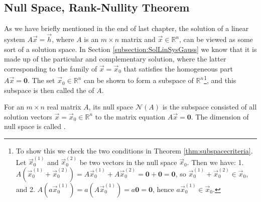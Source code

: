 \subsection{Null Space, Rank-Nullity Theorem}
\label{section:null}

As we have briefly mentioned in the end of last chapter, the solution of a linear system $A\vec{x} = \vec{h}$, where $A$ is an $m \times n$ matrix and $\vec{x} \in \mathbb{R}^n$, can be viewed as some sort of a solution space. In Section \ref{subsection:SolLinSysGauss} we know that it is made up of the particular and complementary solution, where the latter corresponding to the family of $\vec{x} = \vec{x}_0$ that satisfies the homogeneous part $A\vec{x} = \textbf{0}$. The set $\vec{x}_0 \in \mathbb{R}^n$ can be shown to form a subspace of $\mathbb{R}^n$\footnote{To show this we check the two conditions in Theorem \ref{thm:subspacecriteria}. Let $\vec{x}_0^{(1)}$ and $\vec{x}_0^{(2)}$ be two vectors in the null space $\vec{x}_0$. Then we have: 1. $A(\vec{x}_0^{(1)} + \vec{x}_0^{(2)}) = A\vec{x}_0^{(1)} + A\vec{x}_0^{(2)} = \textbf{0} + \textbf{0} = \textbf{0}$, so $\vec{x}_0^{(1)} + \vec{x}_0^{(2)} \in \vec{x}_0$, and 2. $A(a\vec{x}_0^{(1)}) = a(A\vec{x}_0^{(1)}) = a\textbf{0} = \textbf{0}$, hence $a\vec{x}_0^{(1)} \in \vec{x}_0$.}, and this subspace is then called the  of $A$.
\begin{defn}
\label{defn:nullspace}
For an $m \times n$ real matrix $A$, its null space $\mathcal{N}(A)$ is the subspace consisted of all solution vectors $\vec{x} = \vec{x}_0 \in \mathbb{R}^n$ to the matrix equation $A\vec{x} = \textbf{0}$. The dimension of null space is called .
\end{defn}

